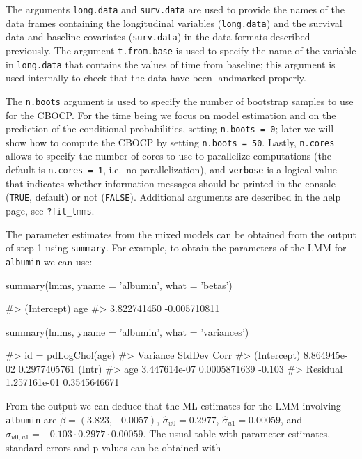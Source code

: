 The arguments \texttt{long.data} and \texttt{surv.data} are used to
provide the names of the data frames containing the longitudinal
variables (\texttt{long.data}) and the survival data and baseline
covariates (\texttt{surv.data}) in the data formats described
previously. The argument \texttt{t.from.base} is used to specify the
name of the variable in \texttt{long.data} that contains the values of
time from baseline; this argument is used internally to check that the
data have been landmarked properly.

The \texttt{n.boots} argument is used to specify the number of bootstrap
samples to use for the CBOCP. For the time being we focus on model
estimation and on the prediction of the conditional probabilities,
setting \texttt{n.boots\ =\ 0}; later we will show how to compute the
CBOCP by setting \texttt{n.boots\ =\ 50}. Lastly, \texttt{n.cores}
allows to specify the number of cores to use to parallelize computations
(the default is \texttt{n.cores\ =\ 1}, i.e.~no parallelization), and
\texttt{verbose} is a logical value that indicates whether information
messages should be printed in the console (\texttt{TRUE}, default) or
not (\texttt{FALSE}). Additional arguments are described in the help
page, see \texttt{?fit\_lmms}.

The parameter estimates from the mixed models can be obtained from the
output of step 1 using \texttt{summary}. For example, to obtain the
parameters of the LMM for \texttt{albumin} we can use:

\begin{Schunk}
\begin{Sinput}
summary(lmms, yname = 'albumin', what = 'betas')
\end{Sinput}
\begin{Soutput}
#>  (Intercept)          age 
#>  3.822741450 -0.005710811
\end{Soutput}
\begin{Sinput}
summary(lmms, yname = 'albumin', what = 'variances')
\end{Sinput}
\begin{Soutput}
#> id = pdLogChol(age) 
#>             Variance     StdDev       Corr  
#> (Intercept) 8.864945e-02 0.2977405761 (Intr)
#> age         3.447614e-07 0.0005871639 -0.103
#> Residual    1.257161e-01 0.3545646671
\end{Soutput}
\end{Schunk}

From the output we can deduce that the ML estimates for the LMM
involving \texttt{albumin} are \(\hat{\beta} = (3.823, -0.0057)\),
\(\hat{\sigma}_{u0} = 0.2977\), \(\hat{\sigma}_{u1} = 0.00059\), and
\(\hat{\sigma}_{u0, u1} = -0.103 \cdot 0.2977 \cdot 0.00059\). The usual
table with parameter estimates, standard errors and p-values can be
obtained with

